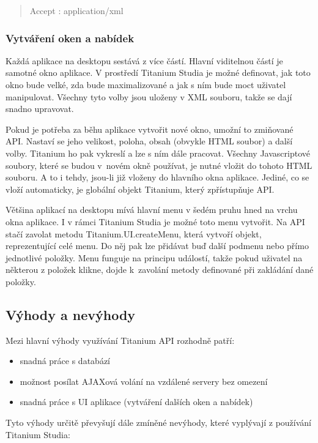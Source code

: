 \begin{quote}
Accept : application\slash xml
\end{quote}

\subsubsection{Vytváření oken a nabídek}

Každá aplikace na desktopu sestává z více částí. Hlavní viditelnou částí je samotné okno aplikace. V prostředí Titanium Studia je možné definovat, jak toto okno bude velké, zda bude maximalizované a jak s ním bude moct uživatel manipulovat. Všechny tyto volby jsou uloženy v XML souboru, takže se dají snadno upravovat.

Pokud je potřeba za běhu aplikace vytvořit nové okno, umožní to zmiňované API. Nastaví se jeho velikost, poloha, obsah (obvykle HTML soubor) a další volby. Titanium ho pak vykreslí a lze s ním dále pracovat. Všechny Javascriptové soubory, které se budou v~novém okně používat, je nutné vložit do tohoto HTML souboru. A to i tehdy, jsou-li již vloženy do hlavního okna aplikace. Jediné, co se vloží automaticky, je globální objekt Titanium, který zpřístupňuje API.

Většina aplikací na desktopu mívá hlavní menu v šedém pruhu hned na vrchu okna aplikace. I v rámci Titanium Studia je možné toto menu vytvořit. Na API stačí zavolat metodu Titanium.UI.createMenu, která vytvoří objekt, reprezentující celé menu. Do něj pak lze přidávat buď další podmenu nebo přímo jednotlivé položky. Menu funguje na principu událostí, takže pokud uživatel na některou z položek klikne, dojde k~zavolání metody definované při zakládání dané položky.

\subsection{Výhody a nevýhody}

Mezi hlavní výhody využívání Titanium API rozhodně patří:

\begin{itemize}
\item snadná práce s databází
\item možnost posílat AJAXová volání na vzdálené servery bez omezení
\item snadná práce s UI aplikace (vytváření dalších oken a nabídek)
\end{itemize}

Tyto výhody určitě převyšují dále zmíněné nevýhody, které vyplývají z používání Titanium Studia:

